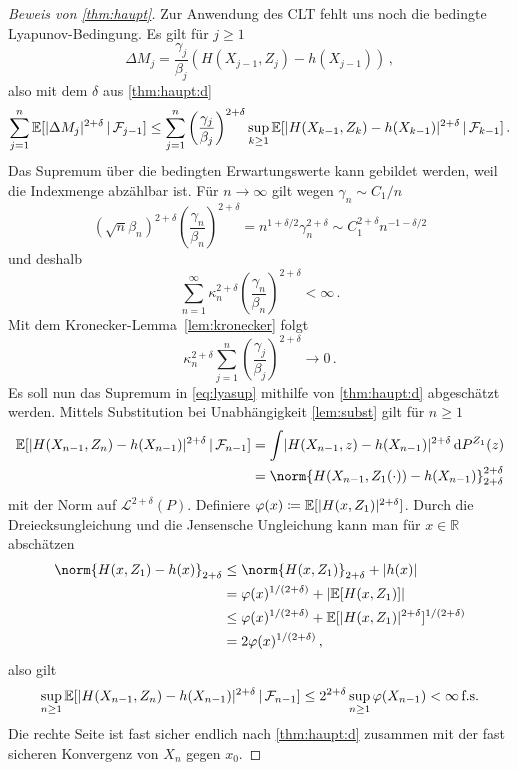 \documentclass[ngerman,a4paper,11pt]{scrartcl}
\newcommand{\EE}{\mathbb{E}}
\newcommand{\RR}{\mathbb{R}}
\newcommand{\ff}{\mathcal{F}}
\renewcommand{\ll}{\mathcal{L}}
\newcommand{\interv}{\RR}
\newcommand{\expect}[1]{\EE[#1]}
\newcommand{\condexp}[2]{\EE[#1\,|\,#2]}
\newcommand{\dvar}[1]{\,\mathrm{d}#1}
\DeclarePairedDelimiter{\abs}{\lvert}{\rvert}		%
\begin{document}
\begin{proof}[Beweis von \cref{thm:haupt}]
Zur Anwendung des CLT fehlt uns noch die bedingte Lyapunov-Bedingung. Es gilt
für $j\geq 1$
\begin{equation*}
 \Delta M_j=\frac{\gamma_j}{\beta_j}(H(X_{j-1},Z_j)-h(X_{j-1}))\,,
\end{equation*}
also mit dem $\delta$ aus \cref{thm:haupt:d}
\begin{equation}\label{eq:lyasup}
 \sum_{j=1}^n\condexp{\abs{\Delta M_j}^{2+\delta}}{\ff_{j-1}}\leq\sum_{j=1}^n\left( \frac{\gamma_j}{\beta_j} \right)^{2+\delta}\sup_{k\geq 1}\condexp{\abs{H(X_{k-1}, Z_k)-h(X_{k-1})}^{2+\delta}}{\ff_{k-1}}\,.
\end{equation}
Das Supremum über die bedingten Erwartungswerte kann gebildet werden, weil die
Indexmenge abzählbar ist. Für $n\to\infty$ gilt wegen $\gamma_n\sim C_1/n$
\begin{equation*}
 (\sqrt{n}\beta_n)^{2+\delta} \left( \frac{\gamma_n}{\beta_n} \right)^{2+\delta}=n^{1+\delta/2}\gamma_n^{2+\delta}\sim C_1^{2+\delta}n^{-1-\delta/2}
\end{equation*}
und deshalb
\begin{equation*}
 \sum_{n=1}^\infty \kappa_n^{2+\delta}\left( \frac{\gamma_n}{\beta_n} \right)^{2+\delta}<\infty\,.
\end{equation*}
Mit dem Kronecker-Lemma~\ref{lem:kronecker} folgt
\begin{equation*}
 \kappa_n^{2+\delta} \sum_{j=1}^n\left( \frac{\gamma_j}{\beta_j} \right)^{2+\delta}\to 0\,.
\end{equation*}
Es soll nun das Supremum in \cref{eq:lyasup} mithilfe von \cref{thm:haupt:d} abgeschätzt werden.
Mittels Substitution bei Unabhängigkeit \ref{lem:subst} gilt für $n\geq 1$
\begin{align*}
  \condexp{\abs{H(X_{n-1},Z_n)-h(X_{n-1})}^{2+\delta}}{\ff_{n-1}}&=\int\abs{H(X_{n-1},z)-h(X_{n-1})}^{2+\delta}\dvar{P^{Z_1}(z)} \\
&=\norm{H(X_{n-1},Z_1(\cdot))-h(X_{n-1})}_{2+\delta}^{2+\delta}
\end{align*}
mit der Norm auf $\ll^{2+\delta}(P)$. Definiere
$\varphi(x)\coloneqq\expect{\abs{H(x,Z_1)}^{2+\delta}}$. Durch die
Dreiecksungleichung und die Jensensche Ungleichung kann man für $x\in \interv$ abschätzen
 \begin{align*}
   \norm{H(x,Z_1)-h(x)}_{2+\delta}&\leq\norm{H(x,Z_1)}_{2+\delta}+\abs{h(x)}\\
    &=\varphi(x)^{1/(2+\delta)}+\abs{\expect{H(x, Z_1)}}\\
&\leq\varphi(x)^{1/(2+\delta)}+\expect{\abs{H(x, Z_1)}^{2+\delta}}^{1/(2+\delta)}\\
&=2\varphi(x)^{1/(2+\delta)}\,,
 \end{align*}
 also gilt
 \begin{equation*}
  \sup_{n\geq 1} \condexp{\abs{H(X_{n-1},Z_n)-h(X_{n-1})}^{2+\delta}}{\ff_{n-1}}\leq 2^{2+\delta}\sup_{n\geq 1}\varphi(X_{n-1})<\infty\,\text{f.s.}
 \end{equation*}
 Die rechte Seite ist fast sicher endlich nach \cref{thm:haupt:d} zusammen mit der fast sicheren Konvergenz von $X_n$
 gegen $x_0$.
 

\end{proof}
\end{document}

